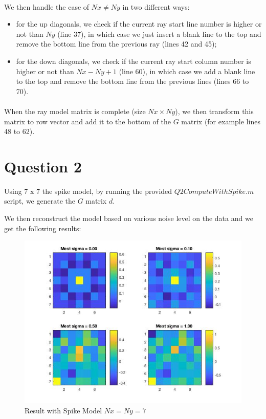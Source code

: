 \documentclass[12pt,a4paper]{extreport}
\begin{document}
\paragraph*{}
We then handle the case of $Nx \neq Ny$ in two different ways:
\begin{itemize}
\item for the up diagonals, we check if the current ray start line number is higher or not than $Ny$ (line 37), in which case we just insert a blank line to the top and remove the bottom line from the previous ray (lines 42 and 45);
\item for the down diagonals, we check if the current ray start column number is higher or not than $Nx - Ny +1$ (line 60), in which case we add a blank line to the top and remove the bottom line from the previous lines (lines 66 to 70).
\end{itemize} 

\paragraph*{}
When the ray model matrix is complete (size $Nx \times Ny$), we then transform this matrix to row vector and add it to the bottom of the $G$ matrix (for example lines 48 to 62).

\section{Question 2}
Using 7 x 7 the spike model, by running the provided $Q2ComputeWithSpike.m$ script, we generate the $G$ matrix $d$.

We then reconstruct the model based on various noise level on the data and we get the following results:
\begin{figure}[h]
\includegraphics[width=15cm]{Q2Image.jpg} 
\caption{Result with Spike Model $Nx=Ny=7$}
\end{figure}
\end{document}
